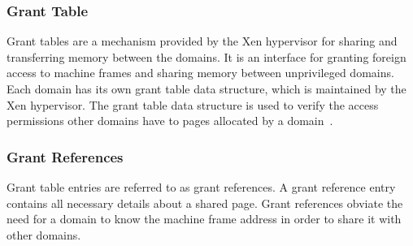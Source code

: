 \subsubsection*{Grant Table} 

Grant tables are a mechanism provided by the Xen hypervisor for sharing
and transferring memory between the domains. It is an interface for
granting foreign access to machine frames and sharing memory between
unprivileged domains. Each domain has its own grant table data structure,
which is maintained by the Xen hypervisor. The grant table data structure
is used to verify the access permissions other domains have to pages
allocated by a domain~\cite{granttable}.

\subsubsection*{Grant References}

Grant table entries are referred to as grant references. A grant reference
entry contains all necessary details about a shared page.
Grant references obviate the need for a domain to know the machine
frame address in order to share it with other 
domains.\cite{Chisnall:2007:DGX:1407351,barham2003xen,granttable}

